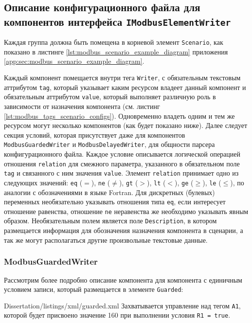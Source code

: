 \subsection{Описание конфигурационного файла для компонентов интерфейса \texttt{IModbusElementWriter}}
Каждая группа должна быть помещена в корневой элемент \texttt{Scenario},
как показано в листинге \ref{lst:modbus_scenario_example_diagram} приложения \ref{app:sec:modbus_scenario_example_diagram}.

Каждый компонент помещается внутри тега \texttt{Writer},
с обязательным текстовым аттрибутом \texttt{tag}, который указывает каким ресурсом владеет данный компонент
и обязательным аттрибутом \texttt{value}, который выполняет различную роль в зависимости от назначения компонента (см. листинг \ref{lst:modbus_tags_scenario_configs}).
Одновременно владеть одним и тем же ресурсом могут несколько компонентов (как будет показано ниже).
Далее следует секция условий, которая присутствует даже для компонентов \texttt{ModbusGuardedWriter} и \texttt{ModbusDelayedWriter},
для общности парсера конфигурационного файла.
Каждое условие описывается логической операцией отношения \texttt{relation} для смежного параметра, указанного в обязательном поле \texttt{tag} и
связанного с ним значения \texttt{value}.
Элемент \texttt{relation} принимает одно из следующих значений:
\texttt{eq} ($=$),
\texttt{ne} ($\neq$),
\texttt{gt} ($>$),
\texttt{lt} ($<$),
\texttt{ge} ($\geq$),
\texttt{le} ($\leq$), по аналогии с обозначениями в языке Fortran.
Для дискретных (булевых) переменных необязательно указывать отношения типа \texttt{eq},
если интересует отношение равенства, отношение \texttt{ne} неравенства же необходимо указывать явным образом.
Необязательным полем является поле \texttt{Description}, в котором размещается информация для
обозначения назначения компонента в сценарии, а так же могут располагаться другие произвольные текстовые данные.

\subsubsection{ModbusGuardedWriter}
Рассмотрим более подробно описание компонента для компонента с единичным условием записи,
который размещается в элементе \texttt{Guarded}:

        {Dissertation/listings/xml/guarded.xml}
Захватывается управление над тегом \texttt{A1}, которой будет присвоено значение 160
при выполнении условия \texttt{R1 = true}.


